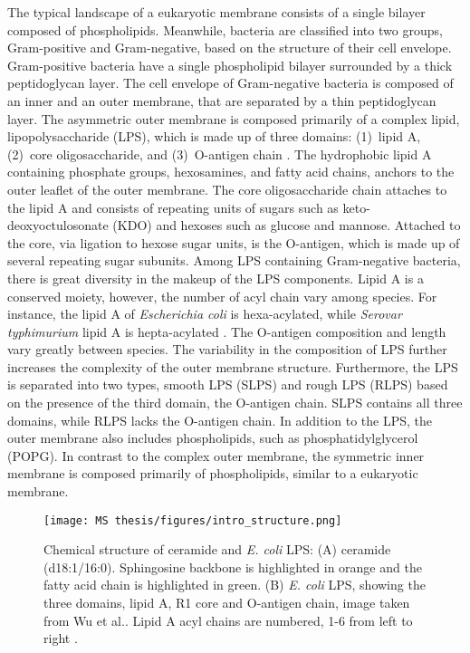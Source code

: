 \documentclass[10pt, letterpaper]{article}
\begin{document}
\par The typical landscape of a eukaryotic membrane consists of a single bilayer composed of phospholipids. Meanwhile, bacteria are classified into two groups, Gram-positive and Gram-negative, based on the structure of their cell envelope. Gram-positive bacteria have a single phospholipid bilayer surrounded by a thick peptidoglycan layer. The cell envelope of Gram-negative bacteria is composed of an inner and an outer membrane, that are separated by a thin peptidoglycan layer. The asymmetric outer membrane is composed primarily of a complex lipid, lipopolysaccharide (LPS), which is made up of three domains: (1)~lipid A, (2)~core oligosaccharide, and (3)~O-antigen chain \cite{rittig2003smooth}. The hydrophobic lipid A containing phosphate groups, hexosamines, and fatty acid chains, anchors to the outer leaflet of the outer membrane. The core oligosaccharide chain attaches to the lipid A and consists of repeating units of sugars such as keto-deoxyoctulosonate (KDO) and hexoses such as glucose and mannose. Attached to the core, via ligation to hexose sugar units, is the O-antigen, which is made up of several repeating sugar subunits.  
Among LPS containing Gram-negative bacteria, there is great diversity in the makeup of the LPS components. Lipid A is a conserved moiety, however, the number of acyl chain vary among species. For instance, the lipid A of \textit{Escherichia coli} is hexa-acylated, while \textit{Serovar typhimurium} lipid A is hepta-acylated \cite{scott2017lipid, kong2012phosphate}.
The O-antigen composition and length vary greatly between species. 
The variability in the composition of LPS further increases the complexity of the outer membrane structure. Furthermore, the LPS is separated into two types, smooth LPS (SLPS) and rough LPS (RLPS) based on the presence of the third domain, the O-antigen chain. SLPS contains all three domains, while RLPS lacks the O-antigen chain. In addition to the LPS, the outer membrane also includes phospholipids, such as phosphatidylglycerol (POPG). In contrast to the complex outer membrane, the symmetric inner membrane is composed primarily of phospholipids, similar to a eukaryotic membrane.

\begin{figure}[H]
  \centerline{\texttt{[image: MS thesis/figures/intro\_structure.png]}}
  \caption[Structure of Lipids]{Chemical structure of ceramide and \textit{E. coli} LPS: (A) ceramide (d18:1/16:0). Sphingosine backbone is highlighted in orange and the fatty acid chain is highlighted in green. (B) \textit{E. coli} LPS, showing the three domains, lipid A, R1 core and O-antigen chain, image taken from Wu et al.\cite{wu2013molecular}. Lipid A acyl chains are numbered, 1-6 from left to right \cite{becam2017antibacterial, wu2013molecular}.}
  \label{fig:structure}
\end{figure}
\end{document}
